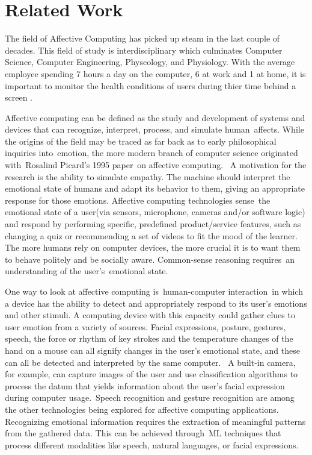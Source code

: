 \section{Related Work}
\label{sec:Related-Work}

The field of Affective Computing has picked up steam in the last couple of decades. 
This field of study is interdisciplinary which culminates Computer Science, Computer Engineering, Physcology, and 
Physiology. With the average employee spending 7 hours a day on the computer, 6 at work and 1 at home, 
it is important to monitor the health conditions of users during thier time behind a screen \cite{computer-time}.

Affective computing can be defined as the study and development of systems and devices that can recognize, interpret, process, and simulate human affects. 
While the origins of the field may be traced as far back as to early philosophical inquiries into emotion, the more modern branch of 
computer science originated with Rosalind Picard's 1995 paper on affective computing.  A motivation for the research is the ability to simulate empathy. \cite{gartner} 
The machine should interpret the emotional state of humans and adapt its behavior to them, giving an appropriate response for those emotions. 
Affective computing technologies sense the emotional state of a user(via sensors, microphone, cameras and/or software logic) and respond by 
performing specific, predefined product/service features, such as changing a quiz or recommending a set of videos to fit the mood of the learner. \cite{techtarget}
The more humans rely on computer devices, the more crucial it is to want them to behave politely and be socially aware. Common-sense reasoning 
requires an understanding of the user’s emotional state.

One way to look at affective computing is human-computer interaction in which a device has the ability to detect and appropriately respond 
to its user’s emotions and other stimuli. A computing device with this capacity could gather clues to user emotion from a variety of sources. 
Facial expressions, posture, gestures, speech, the force or rhythm of key strokes and the temperature changes of the hand on a mouse can 
all signify changes in the user’s emotional state, and these can all be detected and interpreted by the same computer. \cite{curiosity} A built-in camera, 
for example, can capture images of the user and use classification algorithms to process the datum that yields information about the user’s 
facial expression during computer usage. Speech recognition and gesture recognition are among the other technologies being explored for affective 
computing applications. Recognizing emotional information requires the extraction of meaningful patterns from the gathered data. 
This can be achieved through ML techniques that process different modalities like speech, natural languages, or facial expressions. \cite{bbva}

